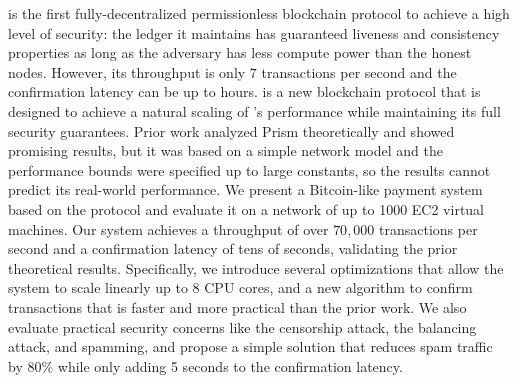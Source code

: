 % 
% 
%
\bitcoin is the first fully-decentralized permissionless blockchain protocol to achieve a high level of security: the ledger it maintains has guaranteed liveness and consistency properties as long as the adversary has less compute power than the honest nodes. However, its throughput is only $7$ transactions per second and the confirmation latency can be up to hours. \prism is a new blockchain protocol that is designed to achieve a natural scaling of \bitcoin's performance while maintaining its full security guarantees. Prior work analyzed Prism theoretically and showed promising results, but it was based on a simple network model and the performance bounds were specified up to large constants, so the results cannot predict its real-world performance. We present a Bitcoin-like payment system based on the \prism protocol and evaluate it on a network of up to 1000 EC2 virtual machines. Our system achieves a throughput of over $70,000$ transactions per second and a confirmation latency of tens of seconds, validating the prior theoretical results. Specifically, we introduce several optimizations that allow the system to scale linearly up to 8 CPU cores, and a new algorithm to confirm transactions that is faster and more practical than the prior work. We also evaluate practical security concerns like the censorship attack, the balancing attack, and spamming, and propose a simple solution that reduces spam traffic by 80\% while only adding 5 seconds to the confirmation latency.
